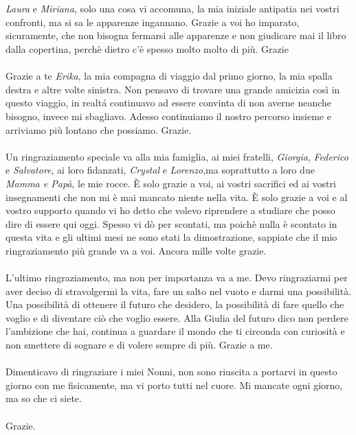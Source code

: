\\
\\
\textit{Laura} e \textit{Miriana}, solo una cosa vi accomuna, la mia iniziale antipatia nei vostri confronti, ma si sa le apparenze ingannano.
Grazie a voi ho imparato, sicuramente, che non bisogna fermarsi alle apparenze e non giudicare mai il libro dalla copertina, perch\`e dietro c'\`e spesso molto molto di pi\`u. Grazie
\\
\\
Grazie a te \textit{Erika}, la mia compagna di viaggio dal primo giorno, la mia spalla destra e altre volte sinistra.
Non pensavo di trovare una grande amicizia cos\`i in questo viaggio, in realt\'a continuavo ad essere convinta di non averne neanche bisogno, invece mi sbagliavo.
Adesso continuiamo il nostro percorso insieme e arriviamo pi\`u lontano che possiamo. Grazie.
\\
\\
Un ringraziamento speciale va alla mia famiglia, ai miei fratelli, \textit{Giorgia}, \textit{Federico} e \textit{Salvatore}, ai loro fidanzati, \textit{Crystal} e \textit{Lorenzo},ma soprattutto a loro due \textit{Mamma e Pap\`a}, le mie rocce.
\`E solo grazie a voi, ai vostri sacrifici ed ai vostri insegnamenti che non mi \`e mai mancato niente nella vita.
\`E solo grazie a voi e al vostro supporto quando vi ho detto che volevo riprendere a studiare che posso dire di essere qui oggi.
Spesso vi d\`o per scontati, ma poich\`e nulla \`e scontato in questa vita e gli ultimi mesi ne sono stati la dimostrazione, sappiate che il mio ringraziamento pi\`u grande va a voi. Ancora mille volte grazie.
\\
\\
L'ultimo ringraziamento, ma non per importanza va a me.
Devo ringraziarmi per aver deciso di stravolgermi la vita, fare un salto nel vuoto e darmi una possibilit\`a.
Una possibilit\`a di ottenere il futuro che desidero, la possibilit\`a di fare quello che voglio e di diventare ci\`o che voglio essere.
Alla Giulia del futuro dico non perdere l'ambizione che hai, continua a guardare il mondo che ti circonda con curiosit\`a e non smettere di sognare e di volere sempre di pi\`u. Grazie a me.
\\
\\
Dimenticavo di ringraziare i miei Nonni, non sono riuscita a portarvi in questo giorno con me fisicamente, ma vi porto tutti nel cuore. Mi mancate ogni giorno, ma so che ci siete. 
\\  
\\
Grazie.